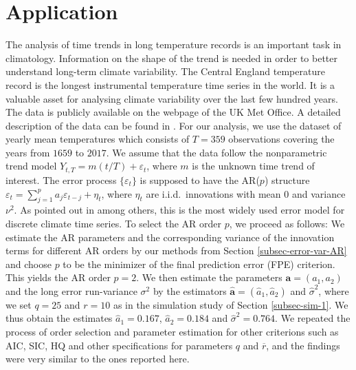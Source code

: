 \begin{enumerate}[label=(\roman*),leftmargin=0.9cm]

\end{enumerate}



\section{Application}\label{sec-data}


The analysis of time trends in long temperature records is an important task in climatology. Information on the shape of the trend is needed in order to better understand long-term climate variability. The Central England temperature record is the longest instrumental temperature time series in the world. It is a valuable asset for analysing climate variability over the last few hundred years. The data is publicly available on the webpage of the UK Met Office. A detailed description of the data can be found in \cite{Parker1992}. For our analysis, we use the dataset of yearly mean temperatures which consists of $T=359$ observations covering the years from $1659$ to $2017$. We assume that the data follow the nonparametric trend model $Y_{t,T} = m(t/T) + \varepsilon_t$, where $m$ is the unknown time trend of interest. The error process $\{ \varepsilon_t \}$ is supposed to have the AR($p$) structure $\varepsilon_t = \sum_{j=1}^p a_j \varepsilon_{t-j} + \eta_t$, where $\eta_t$ are i.i.d.\ innovations with mean $0$ and variance $\nu^2$. As pointed out in \cite{Mudelsee2010} among others, this is the most widely used error model for discrete climate time series. To select the AR order $p$, we proceed as follows: We estimate the AR parameters and the corresponding variance of the innovation terms for different AR orders by our methods from Section \ref{subsec-error-var-AR} and choose $p$ to be the minimizer of the final prediction error (FPE) criterion. This yields the AR order $p = 2$. We then estimate the parameters $\boldsymbol{a} = (a_1,a_2)$ and the long error run-variance $\sigma^2$ by the estimators $\widehat{\boldsymbol{a}} = (\widehat{a}_1,\widehat{a}_2)$ and $\widehat{\sigma}^2$, where we set $q = 25$ and $r =10$ as in the simulation study of Section \ref{subsec-sim-1}. We thus obtain the estimates $\widehat{a}_1 = 0.167$, $\widehat{a}_2 = 0.184$ and $\widehat{\sigma}^2 = 0.764$. We repeated the process of order selection and parameter estimation for other criterions such as AIC, SIC, HQ and other specifications for parameters $q$ and $\overline{r}$, and the findings were very similar to the ones reported here.


